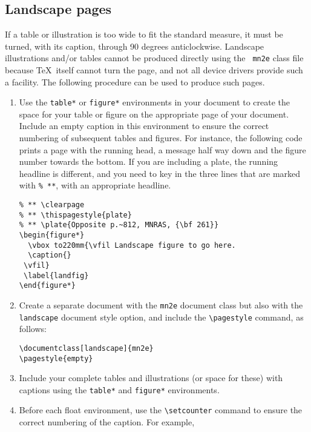 \documentclass[useAMS,usenatbib]{mn2e}
\begin{document}
\subsection{Landscape pages}

If a table or illustration is too wide to fit the standard measure, it must
be turned, with its caption, through 90 degrees anticlockwise. Landscape
illustrations and/or tables cannot be produced directly using the {\tt
mn2e} class file because \TeX\ itself cannot turn the page, and not all
device drivers provide such a facility. The following procedure can be used
to produce such pages.
%
\begin{enumerate}
  \item Use the \verb"table*" or \verb"figure*" environments in your
        document to create the space for your table or figure on the
        appropriate page of your document. Include an empty
        caption in this environment to ensure the correct
        numbering of subsequent tables and figures. For instance, the
        following code prints a page with the running head, a message
        half way down and the figure number towards the bottom. If you
        are including a plate, the running headline is different, and you
        need to key in the three lines that are marked with \verb"% **",
        with an appropriate headline.
%
\begin{verbatim}
% ** \clearpage
% ** \thispagestyle{plate}
% ** \plate{Opposite p.~812, MNRAS, {\bf 261}}
\begin{figure*}
  \vbox to220mm{\vfil Landscape figure to go here.
  \caption{}
 \vfil}
 \label{landfig}
\end{figure*}
\end{verbatim}
%
\item Create a separate document with the {\tt mn2e} document class
      but also with the \verb"landscape" document style option, and
      include the \verb"\pagestyle" command, as follows:
%
\begin{verbatim}
\documentclass[landscape]{mn2e}
\pagestyle{empty}
\end{verbatim}
%
  \item Include your complete tables and illustrations (or space for
        these) with captions using the \verb"table*" and \verb"figure*"
        environments.
  \item Before each float environment, use the
        \verb"\setcounter" command to ensure the correct numbering of
        the caption. For example,
%
\begin{verbatim}

\end{verbatim}
\end{enumerate}
\end{document}
